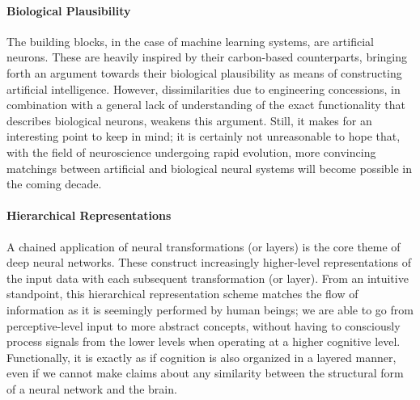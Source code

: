 \documentclass[]{article}
\begin{document}
\paragraph{Biological Plausibility}
The building blocks, in the case of machine learning systems, are artificial neurons. These are heavily inspired by their carbon-based counterparts, bringing forth an argument towards their biological plausibility as means of constructing artificial intelligence. However, dissimilarities due to engineering concessions, in combination with a general lack of understanding of the exact functionality that describes biological neurons, weakens this argument. Still, it makes for an interesting point to keep in mind; it is certainly not unreasonable to hope that, with the field of neuroscience undergoing rapid evolution, more convincing matchings between artificial and biological neural systems will become possible in the coming decade.

\paragraph{Hierarchical Representations}
A chained application of neural transformations (or layers) is the core theme of deep neural networks. These construct increasingly higher-level representations of the input data with each subsequent transformation (or layer). From an intuitive standpoint, this hierarchical representation scheme matches the flow of information as it is seemingly performed by human beings; we are able to go from perceptive-level input to more abstract concepts, without having to consciously process signals from the lower levels when operating at a higher cognitive level. Functionally, it is exactly as if cognition is also organized in a layered manner, even if we cannot make claims about any similarity between the structural form of a neural network and the brain.
\end{document}
